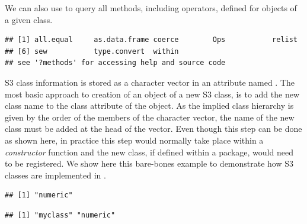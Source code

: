\documentclass[krantz2]{krantz}\usepackage{knitr}
\begin{document}
We can also use  to query all methods, including operators, defined for objects of a given class.

\begin{knitrout}\footnotesize
{}\color{fgcolor}\begin{kframe}
\begin{alltt}
\hlstd{(} \hlstd{=} \hlstd{)}
\end{alltt}
\begin{verbatim}
## [1] all.equal     as.data.frame coerce        Ops           relist       
## [6] sew           type.convert  within       
## see '?methods' for accessing help and source code
\end{verbatim}
\end{kframe}
\end{knitrout}

S3 class information is stored as a character vector in an attribute named . The most basic approach to creation of an object of a new S3 class, is to add the new class name to the class attribute of the object. As the implied class hierarchy is given by the order of the members of the character vector, the name of the new class must be added at the head of the vector. Even though this step can be done as shown here, in practice this step would normally take place within a \emph{constructor} function and the new class, if defined within a package, would need to be registered. We show here this bare-bones example to demonstrate how S3 classes are implemented in \Rlang.

\begin{knitrout}\footnotesize
{}\color{fgcolor}\begin{kframe}
\begin{alltt}
 \hlkwb{<-} 
\end{alltt}
\begin{verbatim}
## [1] "numeric"
\end{verbatim}
\begin{alltt}
 \hlkwb{<-} \hlstd{(}\hlstd{,} 
\end{alltt}
\begin{verbatim}
## [1] "myclass" "numeric"
\end{verbatim}
\end{kframe}
\end{knitrout}
\end{document}
